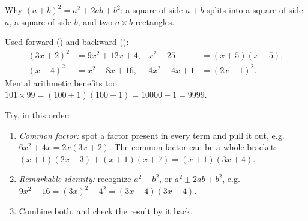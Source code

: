 \begin{omfigure}

{\small Why $(a+b)^2 = a^2 + 2ab + b^2$: a square of side $a + b$ splits
into a square of side $a$, a square of side $b$, and two $a \times b$
rectangles.}
\end{omfigure}

\begin{example}\label{ex:g10:algebra:identities}
Used forward () and backward ():
\begin{align*}
(3x + 2)^2 &= 9x^2 + 12x + 4,
& x^2 - 25 &= (x+5)(x-5), \\
(x - 4)^2 &= x^2 - 8x + 16,
& 4x^2 + 4x + 1 &= (2x + 1)^2 .
\end{align*}
Mental arithmetic benefits too: $101 \times 99 = (100+1)(100-1) =
10000 - 1 = 9999$.
\end{example}

\begin{method}\label{met:g10:algebra:factor}
Try, in this order:
\begin{enumerate}
  \item \emph{Common factor:} spot a factor present in every term and pull
        it out, e.g.\ $6x^2 + 4x = 2x(3x + 2)$. The common factor can be a
        whole bracket: $(x+1)(2x-3) + (x+1)(x+7) = (x+1)(3x+4)$.
  \item \emph{Remarkable identity:} recognize $a^2 - b^2$, or
        $a^2 \pm 2ab + b^2$, e.g.\ $9x^2 - 16 = (3x)^2 - 4^2 =
        (3x+4)(3x-4)$.
  \item Combine both, and check the result by  it back.
\end{enumerate}
\end{method}

